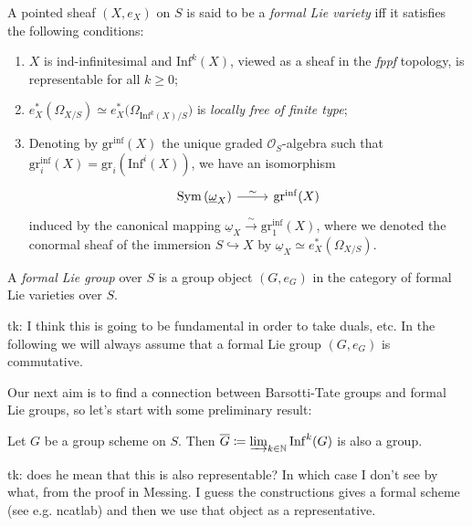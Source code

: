 \documentclass[../Main]{subfiles}
\begin{document}
\begin{defn}
	A pointed sheaf $\left(X, e_X\right)$ on $S$ is said to be
	a {\em formal Lie variety} iff it satisfies the following conditions:
\begin{enumerate}
	\item $X$ is ind-infinitesimal and $\mathrm{Inf}^k(X)$, viewed
		as a sheaf in the {\em fppf} topology,
		is representable for all $k \geq 0$;
	\item $e_X^* \left( \Omega_{X/S} \right) \simeq
		e_X^* \big( \Omega_{\mathrm{Inf}^k(X)/S} \big)$
		is {\em locally free of finite type};
	\item Denoting by $\mathrm{gr}^{\mathrm{inf}}(X)$ the unique graded $\mathcal{O}_{ S }$-algebra
		such that $\mathrm{gr}^{\mathrm{inf}}_i(X) = \mathrm{gr}_i(\mathrm{Inf}^i(X))$,
		we have an isomorphism
		\begin{equation*}
		\begin{tikzcd}[row sep = 0ex
			,/tikz/column 1/.append style={anchor=base east}
			,/tikz/column 2/.append style={anchor=base west}]
		\mathrm{Sym}\left( \underline{\omega}_X \right) \arrow[r, "\sim", rightarrow] &
				\mathrm{gr}^{\mathrm{inf}}(X)
		\end{tikzcd}
		\end{equation*} 
		induced by the canonical mapping
		$\underline{\omega}_X \xrightarrow{\sim} \mathrm{gr}_1^{\mathrm{inf}}(X)$,
		where we denoted the conormal sheaf of the immersion $S \hookrightarrow X$
		by $\underline{\omega}_X \simeq e^*_X \left( \Omega_{X/S} \right)$.
\end{enumerate}
\end{defn}


\begin{defn}
	A {\em formal Lie group} over $S$ is a group object $\left(G, e_G\right)$
	in the category of formal Lie varieties over $S$.
\end{defn}
tk: I think this is going to be fundamental in order to take duals, etc.
In the following we will always assume that a formal Lie group $\left(G, e_G\right)$ 
is commutative.

Our next aim is to find a connection between Barsotti-Tate groups and formal Lie groups,
so let's start with some preliminary result:
\begin{lem}
	Let $G$ be a group scheme on $S$.
	Then $\overline{G} \coloneqq \varinjlim_{k \in \mathbb{N}} \mathrm{Inf}^k(G)$
	is also a group.
\end{lem} 
tk: does he mean that this is also representable? In which case I don't see by what,
from the proof in Messing.
I guess the constructions gives a formal scheme (see e.g. ncatlab) and then we use that object
as a representative.
\end{document}
